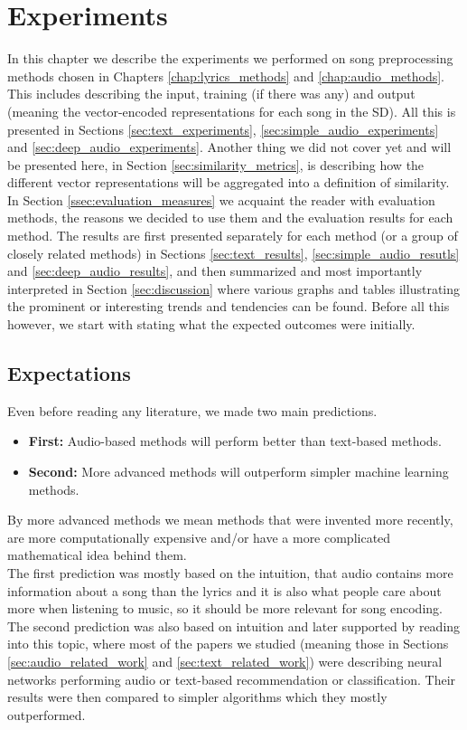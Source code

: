 \chapter{Experiments}\label{chap:experiments}

In this chapter we describe the experiments we performed on song preprocessing methods chosen in Chapters \ref{chap:lyrics_methods} and \ref{chap:audio_methods}. This includes describing the input, training (if there was any) and output (meaning the vector-encoded representations for each song in the SD). All this is presented in Sections \ref{sec:text_experiments}, \ref{sec:simple_audio_experiments} and \ref{sec:deep_audio_experiments}. Another thing we did not cover yet and will be presented here, in Section \ref{sec:similarity_metrics}, is describing how the different vector representations will be aggregated into a definition of similarity.\\
In Section \ref{ssec:evaluation_measures} we acquaint the reader with evaluation methods, the reasons we decided to use them and the evaluation results for each method. The results are first presented separately for each method (or a group of closely related methods) in Sections \ref{sec:text_results}, \ref{sec:simple_audio_resutls} and \ref{sec:deep_audio_results}, and then summarized and most importantly interpreted in Section \ref{sec:discussion} where various graphs and tables illustrating the prominent or interesting trends and tendencies can be found. Before all this however, we start with stating what the expected outcomes were initially.

\section{Expectations}\label{sec:expectations}

Even before reading any literature, we made two main predictions. 
\begin{itemize}
    \item \textbf{First:} Audio-based methods will perform better than text-based methods.
    \item \textbf{Second:} More advanced methods will outperform simpler machine learning methods.
\end{itemize} 
By more advanced methods we mean methods that were invented more recently, are more computationally expensive and/or have a more complicated mathematical idea behind them. \\
The first prediction was mostly based on the intuition, that audio contains more information about a song than the lyrics and it is also what people care about more when listening to music, so it should be more relevant for song encoding. \\
The second prediction was also based on intuition and later supported by reading into this topic, where most of the papers we studied (meaning those in Sections \ref{sec:audio_related_work} and \ref{sec:text_related_work}) were describing neural networks performing audio or text-based recommendation or classification. Their results were then compared to simpler algorithms which they mostly outperformed. \\

